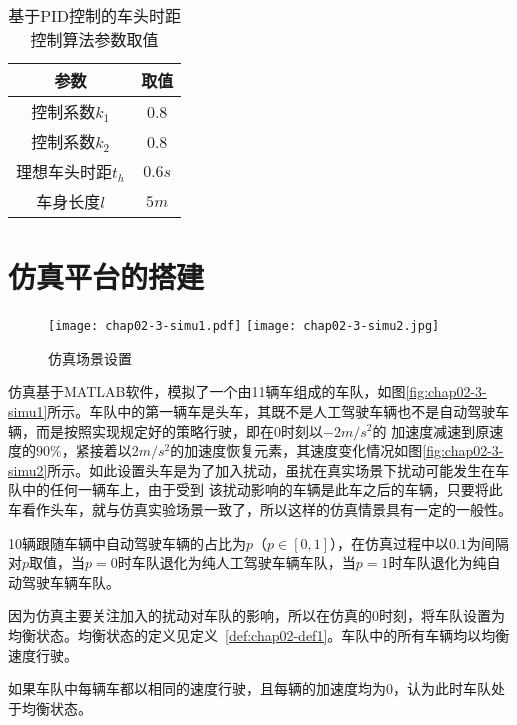 \begin{table}
  \centering
  \caption{基于PID控制的车头时距控制算法参数取值}
  \begin{tabular}{cc}
    \toprule
    参数          &  取值                         \\
    \midrule
    控制系数$k_1$          & 0.8         \\
    控制系数$k_2$          & 0.8     \\
    理想车头时距$t_h$       & $0.6s$             \\
    车身长度$l$            & $5m$         \\
    \bottomrule
  \end{tabular}
  \label{tab:chap02-added}
\end{table}

\section{仿真平台的搭建}
\label{sec:simulation-platform}

\begin{figure}
  \centering
    {\texttt{[image: chap02-3-simu1.pdf]}}
    {\texttt{[image: chap02-3-simu2.jpg]}}
  \caption{仿真场景设置}
  \label{fig:chap02-2-simu}
\end{figure}

仿真基于MATLAB软件，模拟了一个由11辆车组成的车队，如图\ref{fig:chap02-3-simu1}所示。车队中的第一辆车是头车，其既不是人工驾驶车辆也不是自动驾驶车辆，而是按照实现规定好的策略行驶，即在0时刻以$-2m/s^2$的
加速度减速到原速度的$90\%$，紧接着以$2m/s^2$的加速度恢复元素，其速度变化情况如图\ref{fig:chap02-3-simu2}所示。如此设置头车是为了加入扰动，虽扰在真实场景下扰动可能发生在车队中的任何一辆车上，由于受到
该扰动影响的车辆是此车之后的车辆，只要将此车看作头车，就与仿真实验场景一致了，所以这样的仿真情景具有一定的一般性。

10辆跟随车辆中自动驾驶车辆的占比为$p$（$p \in [0, 1]$），在仿真过程中以$0.1$为间隔对$p$取值，当$p=0$时车队退化为纯人工驾驶车辆车队，当$p=1$时车队退化为纯自动驾驶车辆车队。

因为仿真主要关注加入的扰动对车队的影响，所以在仿真的0时刻，将车队设置为均衡状态。均衡状态的定义见定义~\ref{def:chap02-def1}。车队中的所有车辆均以均衡速度行驶。

\begin{definition}[车队的均衡状态]
  如果车队中每辆车都以相同的速度行驶，且每辆的加速度均为0，认为此时车队处于均衡状态。
  \label{def:chap02-def1}
\end{definition}

